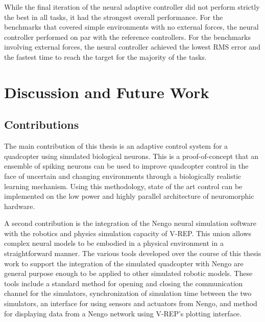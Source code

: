 \documentclass[letterpaper,12pt,titlepage,oneside,final]{book}
\begin{document}
While the final iteration of the neural adaptive controller did not perform strictly the best in all tasks, it had the strongest overall performance.
For the benchmarks that covered simple environments with no external forces, the neural controller performed on par with the reference controllers.
For the benchmarks involving external forces, the neural controller achieved the lowest RMS error and the fastest time to reach the target for the majority of the tasks.
 
\chapter{Discussion and Future Work} \label{chap:discussion}

\section{Contributions}


The main contribution of this thesis is an adaptive control system for a quadcopter using simulated biological neurons.
This is a proof-of-concept that an ensemble of spiking neurons can be used to improve quadcopter control in the face of uncertain and changing environments through a biologically realistic learning mechanism.
Using this methodology, state of the art control can be implemented on the low power and highly parallel architecture of neuromorphic hardware.

A second contribution is the integration of the Nengo neural simulation software with the robotics and physics simulation capacity of V-REP.
This union allows complex neural models to be embodied in a physical environment in a straightforward manner.
The various tools developed over the course of this thesis work to support the integration of the simulated quadcopter with Nengo are general purpose enough to be applied to other simulated robotic models.
These tools include a standard method for opening and closing the communication channel for the simulators, synchronization of simulation time between the two simulators, an interface for using sensors and actuators from Nengo, and method for displaying data from a Nengo network using V-REP's plotting interface.
\end{document}
